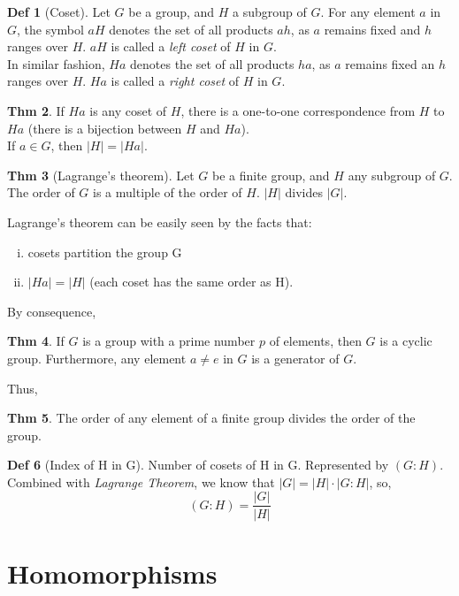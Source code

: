 \documentclass{article}
\theoremstyle{definition}
\newtheorem{definition}{Def}[section]
\newtheorem{theorem}[definition]{Thm}
\begin{document}
\begin{definition}[Coset]
    Let $G$ be a group, and $H$ a subgroup of $G$. For any element $a$ in $G$, the symbol $aH$ denotes the set of all products $ah$, as $a$ remains fixed and $h$ ranges over $H$. $aH$ is called a \emph{left coset} of $H$ in $G$.
    \\
    In similar fashion, $Ha$ denotes the set of all products $ha$, as $a$ remains fixed an $h$ ranges over $H$. $Ha$ is called a \emph{right coset} of $H$ in $G$.
\end{definition}

\begin{theorem}
    If $Ha$ is any coset of $H$, there is a one-to-one correspondence from $H$ to $Ha$ (there is a bijection between $H$ and $Ha$).\\
    If $a \in G$, then $|H| = |Ha|$.
\end{theorem}

\begin{theorem}[Lagrange's theorem]
    Let $G$ be a finite group, and $H$ any subgroup of $G$. The order of $G$ is a multiple of the order of $H$. $|H|$ divides $|G|$.
\end{theorem}
    Lagrange's theorem can be easily seen by the facts that:
    \begin{enumerate}[i.]
	\item cosets partition the group G
	\item $|Ha| = |H|$ (each coset has the same order as H). 
    \end{enumerate}

By consequence,
\begin{theorem}
    If $G$ is a group with a prime number $p$ of elements, then $G$ is a cyclic group. Furthermore, any element $a \neq e$ in $G$ is a generator of $G$.
\end{theorem}

Thus,
\begin{theorem}
    The order of any element of a finite group divides the order of the group.
\end{theorem}

\begin{definition}[Index of H in G]
    Number of cosets of H in G. Represented by $(G:H)$.\\
    Combined with \emph{Lagrange Theorem}, we know that $|G| = |H| \cdot |G:H|$, so,
    $$(G:H) = \frac{|G|}{|H|}$$
\end{definition}


\section{Homomorphisms}
\end{document}
